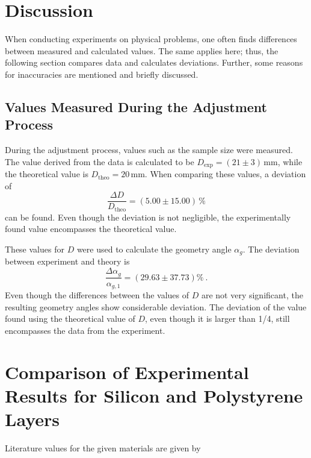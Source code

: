 
\section{Discussion}

When conducting experiments on physical problems, one often finds differences between measured and calculated values. The same applies here; thus, the following section compares data and calculates deviations. Further, some reasons for inaccuracies are mentioned and briefly discussed.

\subsection{Values Measured During the Adjustment Process}

During the adjustment process, values such as the sample size were measured. The value derived from the data is calculated to be $D_{\text{exp}} = (21 \pm 3)\, \unit{\milli \meter}$, while the theoretical value is $D_{\text{theo}} = 20 \, \unit{\milli \meter}$. When comparing these values, a deviation of 
\begin{equation*}
    \frac{\Delta D}{D_{\text{theo}}} = (5.00 \pm 15.00) \, \%
\end{equation*}
can be found. Even though the deviation is not negligible, the experimentally found value encompasses the theoretical value.

These values for $D$ were used to calculate the geometry angle $\alpha_g$. The deviation between experiment and theory is
\begin{equation*}
    \frac{\Delta \alpha_g}{\alpha_{g,1}} = (29.63 \pm 37.73) \% \: .
\end{equation*}
Even though the differences between the values of $D$ are not very significant, the resulting geometry angles show considerable deviation. The deviation of the value found using the theoretical value of $D$, even though it is larger than 1/4, still encompasses the data from the experiment.

\section{Comparison of Experimental Results for Silicon and Polystyrene Layers}
Literature values for the given materials are given by 

